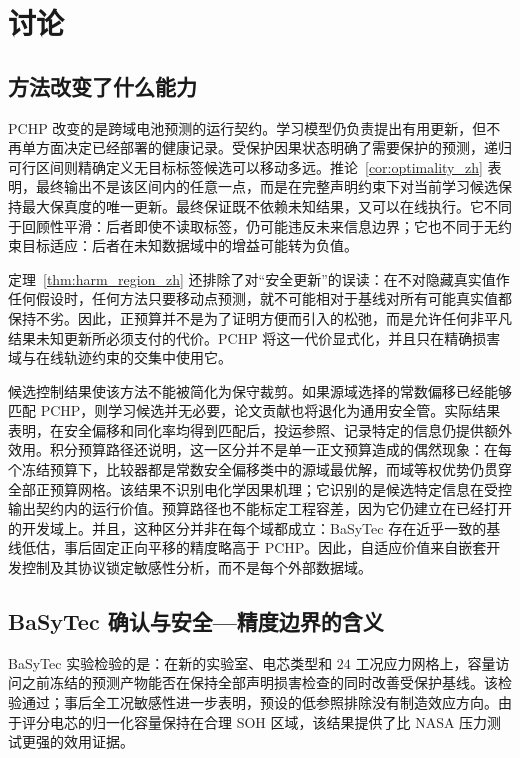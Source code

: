 \documentclass[UTF8,11pt]{ctexart}
\begin{document}
\section{讨论}

\subsection{方法改变了什么能力}

PCHP 改变的是跨域电池预测的运行契约。学习模型仍负责提出有用更新，但不再单方面决定已经部署的健康记录。受保护因果状态明确了需要保护的预测，递归可行区间则精确定义无目标标签候选可以移动多远。推论~\ref{cor:optimality_zh} 表明，最终输出不是该区间内的任意一点，而是在完整声明约束下对当前学习候选保持最大保真度的唯一更新。最终保证既不依赖未知结果，又可以在线执行。它不同于回顾性平滑：后者即使不读取标签，仍可能违反未来信息边界；它也不同于无约束目标适应：后者在未知数据域中的增益可能转为负值。

定理~\ref{thm:harm_region_zh} 还排除了对“安全更新”的误读：在不对隐藏真实值作任何假设时，任何方法只要移动点预测，就不可能相对于基线对所有可能真实值都保持不劣。因此，正预算并不是为了证明方便而引入的松弛，而是允许任何非平凡结果未知更新所必须支付的代价。PCHP 将这一代价显式化，并且只在精确损害域与在线轨迹约束的交集中使用它。

候选控制结果使该方法不能被简化为保守裁剪。如果源域选择的常数偏移已经能够匹配 PCHP，则学习候选并无必要，论文贡献也将退化为通用安全管。实际结果表明，在安全偏移和同化率均得到匹配后，投运参照、记录特定的信息仍提供额外效用。积分预算路径还说明，这一区分并不是单一正文预算造成的偶然现象：在每个冻结预算下，比较器都是常数安全偏移类中的源域最优解，而域等权优势仍贯穿全部正预算网格。该结果不识别电化学因果机理；它识别的是候选特定信息在受控输出契约内的运行价值。预算路径也不能标定工程容差，因为它仍建立在已经打开的开发域上。并且，这种区分并非在每个域都成立：BaSyTec 存在近乎一致的基线低估，事后固定正向平移的精度略高于 PCHP。因此，自适应价值来自嵌套开发控制及其协议锁定敏感性分析，而不是每个外部数据域。

\subsection{BaSyTec 确认与安全—精度边界的含义}

BaSyTec 实验检验的是：在新的实验室、电芯类型和 $24$ 工况应力网格上，容量访问之前冻结的预测产物能否在保持全部声明损害检查的同时改善受保护基线。该检验通过；事后全工况敏感性进一步表明，预设的低参照排除没有制造效应方向。由于评分电芯的归一化容量保持在合理 SOH 区域，该结果提供了比 NASA 压力测试更强的效用证据。
\end{document}
